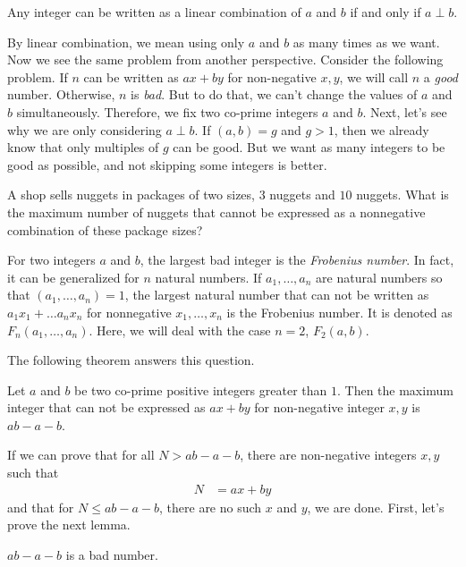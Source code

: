	\begin{theorem}
		Any integer can be written as a linear combination of $a$ and $b$ if and only if $a\perp b$.
	\end{theorem}
By linear combination, we mean using only $a$ and $b$ as many times as we want. Now we see the same problem from another perspective. Consider the following problem. If $n$ can be written as $ax+by$ for non-negative $x,y$, we will call $n$ a \textit{good} number. Otherwise, $n$ is \textit{bad}. But to do that, we can't change the values of $a$ and $b$ simultaneously. Therefore, we fix two co-prime integers $a$ and $b$. Next, let's see why we are only considering $a\perp b$. If $(a,b)=g$ and $g>1$, then we already know that only multiples of $g$ can be good. But we want as many integers to be good as possible, and not skipping some integers is better.
	\begin{problem}
		A shop sells nuggets in packages of two sizes, $3$ nuggets and $10$ nuggets. What is the maximum number of nuggets that cannot be expressed as a nonnegative combination of these package sizes?
	\end{problem}

	\begin{definition}
		For two integers $a$ and $b$, the largest bad integer is the \textit{Frobenius number}. In fact, it can be generalized for $n$ natural numbers. If $a_1,\ldots,a_n$ are natural numbers so that $(a_1,\ldots,a_n)=1$, the largest natural number that can not be written as $a_1x_1+\ldots a_nx_n$ for nonnegative $x_1,\ldots,x_n$ is the Frobenius number. It is denoted as $F_n(a_1,\ldots,a_n)$. Here, we will deal with the case $n=2$, $F_2(a,b)$.
	\end{definition}
The following theorem answers this question.
	\begin{theorem}
		Let $a$ and $b$ be two co-prime positive integers greater than $1$. Then the maximum integer that can not be expressed as $ax+by$ for non-negative integer $x,y$ is $ab-a-b$.
	\end{theorem}
If we can prove that for all $N>ab-a-b$, there are non-negative integers $x,y$ such that
	\begin{align*}
		N & = ax+by
	\end{align*}
and that for $N\leq ab-a-b$, there are no such $x$ and $y$, we are done. First, let's prove the next lemma.
	\begin{lemma}
		$ab-a-b$ is a bad number.
	\end{lemma}

